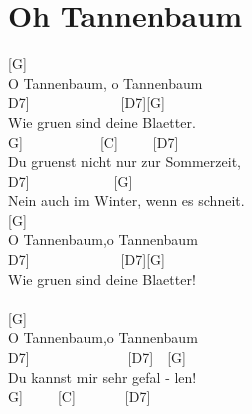 \documentclass[
  letterpaper,
  twoside=false]{scrbook}
\begin{document}
\hypertarget{oh-tannenbaum}{%
\chapter{Oh Tannenbaum}\label{oh-tannenbaum}}

{[}G{]}~~~~~~~~~~\\
O Tannenbaum, o Tannenbaum\\
\hspace*{0.333em}\hspace*{0.333em}\hspace*{0.333em}{[}D7{]}~~~~~~~~~~~~~{[}D7{]}{[}G{]}~~~~~~\\
Wie gruen sind deine Blaetter.\\
\hspace*{0.333em}\hspace*{0.333em}{[}G{]}~~~~~~~~~~~{[}C{]}~~~~~{[}D7{]}~~~~~\\
Du gruenst nicht nur zur Sommerzeit,\\
\hspace*{0.333em}\hspace*{0.333em}\hspace*{0.333em}\hspace*{0.333em}{[}D7{]}~~~~~~~~~~~~{[}G{]}~~~~~\\
Nein auch im Winter, wenn es schneit.\\
{[}G{]}~~~~~~\\
O Tannenbaum,o Tannenbaum\\
\hspace*{0.333em}\hspace*{0.333em}\hspace*{0.333em}{[}D7{]}~~~~~~~~~~~~~{[}D7{]}{[}G{]}~~~~~\\
Wie gruen sind deine Blaetter!\\
\hspace*{0.333em}\hspace*{0.333em}\\
{[}G{]}~~\\
O Tannenbaum,o Tannenbaum\\
\hspace*{0.333em}\hspace*{0.333em}{[}D7{]}~~~~~~~~~~~~~~{[}D7{]}~~{[}G{]}~~~~~~\\
Du kannst mir sehr gefal - len!\\
\hspace*{0.333em}\hspace*{0.333em}\hspace*{0.333em}{[}G{]}~~~~~{[}C{]}~~~~~~~{[}D7{]}~~~~~~~\\
\end{document}
